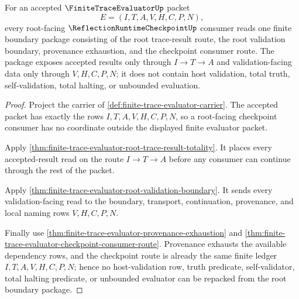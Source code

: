 \begin{theorem}
\label{thm:finite-trace-evaluator-root-boundary-package}
For an accepted $\FiniteTraceEvaluatorUp$ packet
$$
E=(I,T,A,V,H,C,P,N),
$$
every root-facing $\ReflectionRuntimeCheckpointUp$ consumer reads one finite
boundary package consisting of the root trace-result route, the root validation
boundary, provenance exhaustion, and the checkpoint consumer route. The package
exposes accepted results only through $I \to T \to A$ and validation-facing
data only through $V,H,C,P,N$; it does not contain host validation, total
truth, self-validation, total halting, or unbounded evaluation.
\end{theorem}
\begin{proof}
Project the carrier of \autoref{def:finite-trace-evaluator-carrier}. The
accepted packet has exactly the rows $I,T,A,V,H,C,P,N$, so a root-facing
checkpoint consumer has no coordinate outside the displayed finite evaluator
packet.

Apply \autoref{thm:finite-trace-evaluator-root-trace-result-totality}. It
places every accepted-result read on the route $I \to T \to A$ before any
consumer can continue through the rest of the packet.

Apply \autoref{thm:finite-trace-evaluator-root-validation-boundary}. It sends
every validation-facing read to the boundary, transport, continuation,
provenance, and local naming rows $V,H,C,P,N$.

Finally use \autoref{thm:finite-trace-evaluator-provenance-exhaustion} and
\autoref{thm:finite-trace-evaluator-checkpoint-consumer-route}. Provenance
exhausts the available dependency rows, and the checkpoint route is already
the same finite ledger $I,T,A,V,H,C,P,N$; hence no host-validation row, truth
predicate, self-validator, total halting predicate, or unbounded evaluator can
be repacked from the root boundary package.
\end{proof}

